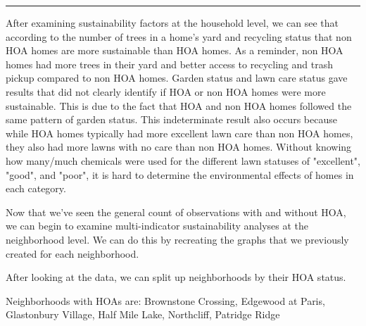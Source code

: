 \documentclass{article}
\begin{document}
\noindent\rule{16cm}{0.4pt}
\newline
After examining sustainability factors at the household level, we can see that according to the number of trees in a home's yard and recycling status that non HOA homes are more sustainable than HOA homes. As a reminder, non HOA homes had more trees in their yard and better access to recycling and trash pickup compared to non HOA homes. Garden status and lawn care status gave results that did not clearly identify if HOA or non HOA homes were more sustainable. This is due to the fact that HOA and non HOA homes followed the same pattern of garden status. This indeterminate result also occurs because while HOA homes typically had more excellent lawn care than non HOA homes, they also had more lawns with no care than non HOA homes. Without knowing how many/much chemicals were used for the different lawn statuses of "excellent", "good", and "poor", it is hard to determine the environmental effects of homes in each category.
\newline

Now that we've seen the general count of observations with and without HOA, we can begin to examine multi-indicator sustainability analyses at the neighborhood level. We can do this by recreating the graphs that we previously created for each neighborhood. 
\newline

After looking at the data, we can split up neighborhoods by their HOA status.
\newline

Neighborhoods with HOAs are: Brownstone Crossing, Edgewood at Paris, Glastonbury Village, Half Mile Lake, Northcliff, Patridge Ridge
\end{document}
